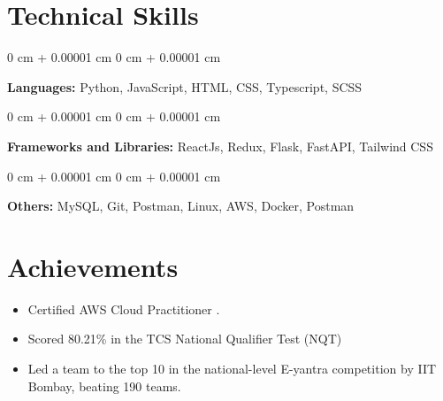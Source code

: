 \documentclass[10pt, letterpaper]{article}
\newenvironment{highlightsforbulletentries}{
    \begin{itemize}[
        topsep=0.10 cm,
        parsep=0.10 cm,
        partopsep=0pt,
        itemsep=0pt,
        leftmargin=10pt
    ]
}{
    \end{itemize}
} %
\newenvironment{onecolentry}{
    \begin{adjustwidth}{
        0 cm + 0.00001 cm
    }{
        0 cm + 0.00001 cm
    }
}{
    \end{adjustwidth}
} %
\begin{document}





    \section{Technical Skills}
        
        \begin{onecolentry}
            \textbf{Languages:} Python, JavaScript, HTML, CSS, Typescript, SCSS
        \end{onecolentry}

        \vspace{0.2 cm}

        \begin{onecolentry}
            \textbf{Frameworks and Libraries:} ReactJs, Redux, Flask, FastAPI, Tailwind CSS
        \end{onecolentry}

        \vspace{0.2 cm}

        \begin{onecolentry}
            \textbf{Others:} MySQL, Git, Postman, Linux, AWS, Docker, Postman
        \end{onecolentry}

        \vspace{0.2 cm}

    
    \section{Achievements}
  
        \begin{highlightsforbulletentries}
            \item Certified AWS Cloud Practitioner .
            \item Scored 80.21\% in the TCS National Qualifier Test (NQT)
            \item Led a team to the top 10 in the national-level E-yantra competition by IIT Bombay, beating 190 teams.
        \end{highlightsforbulletentries}
\end{document}

